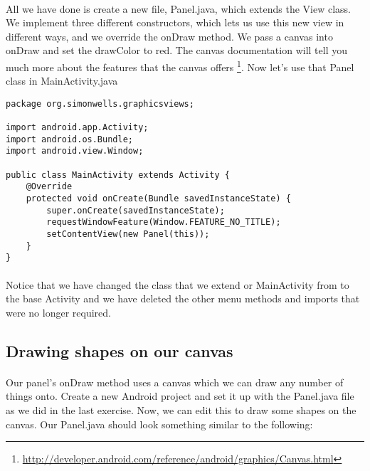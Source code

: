 \paragraph{} All we have done is create a new file, Panel.java, which extends the View class. We implement three different constructors, which lets us use this new view in different ways, and we override the onDraw method. We pass a canvas into onDraw and set the drawColor to red. The canvas documentation will tell you much more about the features that the canvas offers \footnote{\url{http://developer.android.com/reference/android/graphics/Canvas.html}}. Now let's use that Panel class in MainActivity.java

\begin{lstlisting}
package org.simonwells.graphicsviews;

import android.app.Activity;
import android.os.Bundle;
import android.view.Window;

public class MainActivity extends Activity {
    @Override
    protected void onCreate(Bundle savedInstanceState) {
        super.onCreate(savedInstanceState);
        requestWindowFeature(Window.FEATURE_NO_TITLE);
        setContentView(new Panel(this));
    }
}
\end{lstlisting}

\paragraph{} Notice that we have changed the class that we extend or MainActivity from to the base Activity and we have deleted the other menu methods and imports that were no longer required.

\subsection{Drawing shapes on our canvas}
\paragraph{} Our panel's onDraw method uses a canvas which we can draw any number of things onto. Create a new Android project and set it up with the Panel.java file as we did in the last exercise. Now, we can edit this to draw some shapes on the canvas. Our Panel.java should look something similar to the following:

